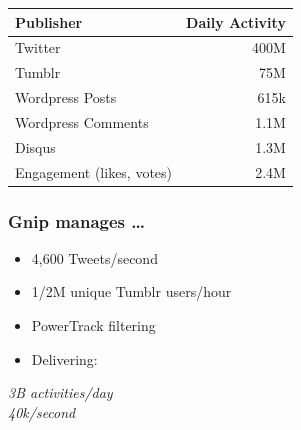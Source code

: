 \documentclass{beamer}
\begin{document}

\begin{frame} 
\begin{table}
\begin{tabular}{l|r}
\hline
   {Publisher}   &   {Daily Activity}   \\ [1pt]
\hline 
    Twitter      &      400M   \\
    Tumblr      &        75M   \\
    Wordpress Posts &     615k   \\
    Wordpress Comments & 1.1M \\
    Disqus       &       1.3M  \\
    Engagement (likes, votes) & 2.4M  \\
\hline
\end{tabular}
\end{table}
\end{frame}

\begin{frame}\frametitle{Gnip manages \dots}
\Large{
\begin{itemize}
\item 4,600 Tweets/second \\ [2pt]
\item 1/2M unique Tumblr users/hour \\  [2pt]
\item PowerTrack filtering \\  [15pt]
\item Delivering: \\
\end{itemize}
}
\begin{center}
\Huge{\emph{3B activities/day \\ 40k/second}}
\end{center}
\end{frame}




\begin{frame}
\begin{center}
\end{center}
\end{frame}
\end{document}
